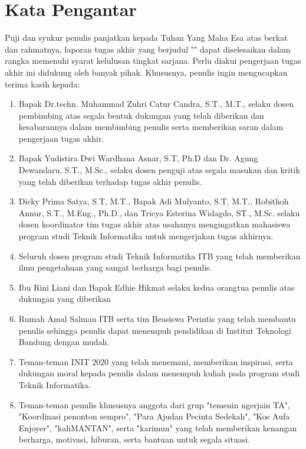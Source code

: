 \chapter*{Kata Pengantar}

Puji dan syukur penulis panjatkan kepada Tuhan Yang Maha Esa atas berkat dan rahmatnya, laporan tugas akhir yang berjudul "\thetitle" dapat diselesaikan dalam rangka memenuhi syarat kelulusan tingkat sarjana. Perlu diakui pengerjaan tugas akhir ini didukung oleh banyak pihak. Khususnya, penulis ingin mengucapkan terima kasih kepada:

\begin{enumerate}
	\item Bapak Dr.techn. Muhammad Zuhri Catur Candra, S.T., M.T., selaku dosen pembimbing atas segala bentuk dukungan yang telah diberikan dan kesabarannya dalam membimbing penulis serta memberikan saran dalam pengerjaan tugas akhir.
	\item Bapak Yudistira Dwi Wardhana Asnar, S.T, Ph.D dan Dr. Agung Dewandaru, S.T., M.Sc., selaku dosen penguji atas segala masukan dan kritik yang telah diberikan terhadap tugas akhir penulis.
	\item Dicky Prima Satya, S.T, M.T., Bapak Adi Mulyanto, S.T, M.T., Robithoh Annur, S.T., M.Eng., Ph.D., dan Tricya Esterina Widagdo, ST., M.Sc. selaku dosen koordinator tim tugas akhir atas usahanya mengingatkan mahasiswa program studi Teknik Informatika untuk mengerjakan tugas akhirnya.
	\item Seluruh dosen program studi Teknik Informatika ITB yang telah memberikan ilmu pengetahuan yang sangat berharga bagi penulis.
	\item Ibu Rini Liani dan Bapak Edhie Hikmat selaku kedua orangtua penulis atas dukungan yang diberikan
	\item Rumah Amal Salman ITB serta tim Beasiswa Perintis yang telah membantu penulis sehingga penulis dapat menempuh pendidikan di Institut Teknologi Bandung dengan mudah.
	\item Teman-teman INIT 2020 yang telah menemani, memberikan inspirasi, serta dukungan moral kepada penulis dalam menempuh kuliah pada program studi Teknik Informatika.
	\item Teman-teman penulis khususnya anggota dari grup "temenin ngerjain TA", "Koordinasi penonton sempro", "Para Ajudan Pecinta Sedekah", "Kos Aufa Enjoyer", "kaliMANTAN", serta "karimun" yang telah memberikan kenangan berharga, motivasi, hiburan, serta bantuan untuk segala situasi.

\end{enumerate}
